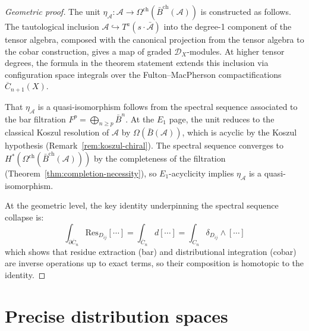 \begin{proof}[Geometric proof]
The unit $\eta_{\mathcal{A}} \colon \mathcal{A} \to \Omega^{\mathrm{ch}}(\bar{B}^{\mathrm{ch}}(\mathcal{A}))$ is constructed as follows.  The tautological inclusion $\mathcal{A} \hookrightarrow T^a(s \cdot \bar{\mathcal{A}})$ into the degree-1 component of the tensor algebra, composed with the canonical projection from the tensor algebra to the cobar construction, gives a map of graded $\mathcal{D}_X$-modules.  At higher tensor degrees, the formula in the theorem statement extends this inclusion via configuration space integrals over the Fulton--MacPherson compactifications $\overline{C}_{n+1}(X)$.

\begin{center}
\end{center}

That $\eta_{\mathcal{A}}$ is a quasi-isomorphism follows from the spectral sequence associated to the bar filtration $F^p = \bigoplus_{n \geq p} \bar{B}^n$.  At the $E_1$ page, the unit reduces to the classical Koszul resolution of $\mathcal{A}$ by $\Omega(\bar{B}(\mathcal{A}))$, which is acyclic by the Koszul hypothesis (Remark~\ref{rem:koszul-chiral}).  The spectral sequence converges to $H^*(\Omega^{\mathrm{ch}}(\bar{B}^{\mathrm{ch}}(\mathcal{A})))$ by the completeness of the filtration (Theorem~\ref{thm:completion-necessity}), so $E_1$-acyclicity implies $\eta_{\mathcal{A}}$ is a quasi-isomorphism.

At the geometric level, the key identity underpinning the spectral sequence collapse is:
\[
\int_{\partial \overline{C}_n} \text{Res}_{D_{ij}}[\cdots] = \int_{\overline{C}_n} d[\cdots] = \int_{C_n} \delta_{D_{ij}} \wedge [\cdots]
\]
which shows that residue extraction (bar) and distributional integration (cobar) are inverse operations up to exact terms, so their composition is homotopic to the identity.
\end{proof}

\section{Precise distribution spaces}

